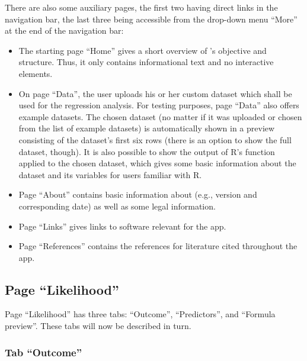 There are also some auxiliary pages, the first two having direct links in the
navigation bar, the last three being accessible from the drop-down menu ``More''
at the end of the navigation bar:
\begin{itemize}
  \item The starting page ``Home'' gives a short overview of
  's objective and structure. Thus, it only contains informational
  text and no interactive elements.

  \item On page ``Data'', the user uploads his or her custom dataset which shall
  be used for the regression analysis. For testing purposes, page ``Data'' also
  offers example datasets. The chosen dataset (no matter if it was uploaded or
  chosen from the list of example datasets) is automatically shown in a preview
  consisting of the dataset's first six rows (there is an option to show the
  full dataset, though). It is also possible to
  show the output of R's  function applied to the chosen
  dataset, which gives some basic information about the dataset and its
  variables for users familiar with R.

  \item Page ``About'' contains basic information about 
  (e.g., version and corresponding date) as well as some legal information.

  \item Page ``Links'' gives links to software relevant for the
   app.

  \item Page ``References'' contains the references for literature cited
  throughout the app.
\end{itemize}

\subsection[Page "Likelihood"]{Page ``Likelihood''}
\label{page-lik}

Page ``Likelihood'' has three tabs: ``Outcome'',
``Predictors'', and ``Formula preview''. These tabs will now be
described in turn.

\subsubsection[Tab "Outcome"]{Tab ``Outcome''}
\label{tab-outc}

